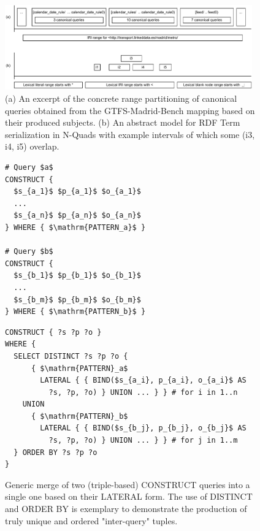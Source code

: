 \begin{figure}[htb]
\centering
\includegraphics[width=0.95\textwidth]{images/range-partitioning.pdf}
%

\caption{(a) An excerpt of the concrete range partitioning of canonical queries obtained from the GTFS-Madrid-Bench mapping based on their produced subjects. (b) An abstract model for RDF Term serialization in N-Quads with example intervals of which some (i3, i4, i5) overlap.}
\label{fig:range-partitioning}
\end{figure}


\begin{figure}[!h]
 \begin{minipage}[t]{0.29\textwidth}
  \centering
  \begin{lstlisting}[language=SPARQL, mathescape=true]
# Query $a$
CONSTRUCT {
  $s_{a_1}$ $p_{a_1}$ $o_{a_1}$
  ...
  $s_{a_n}$ $p_{a_n}$ $o_{a_n}$
} WHERE { $\mathrm{PATTERN_a}$ }

# Query $b$
CONSTRUCT {
  $s_{b_1}$ $p_{b_1}$ $o_{b_1}$
  ...
  $s_{b_m}$ $p_{b_m}$ $o_{b_m}$
} WHERE { $\mathrm{PATTERN_b}$ }
  \end{lstlisting}
 \end{minipage}
 \begin{minipage}[t]{0.69\textwidth}
  \centering
  \begin{lstlisting}[language=SPARQL, mathescape=true]
CONSTRUCT { ?s ?p ?o }
WHERE {
  SELECT DISTINCT ?s ?p ?o {
      { $\mathrm{PATTERN}_a$
        LATERAL { { BIND($s_{a_i}, p_{a_i}, o_{a_i}$ AS
          ?s, ?p, ?o) } UNION ... } } # for i in 1..n
    UNION
      { $\mathrm{PATTERN}_b$
        LATERAL { { BIND($s_{b_j}, p_{b_j}, o_{b_j}$ AS
          ?s, ?p, ?o) } UNION ... } } # for j in 1..m
  } ORDER BY ?s ?p ?o
}
  \end{lstlisting}
 \end{minipage}
 \vspace*{-5mm}
 \caption{Generic merge of two (triple-based) CONSTRUCT queries into a single one based on their LATERAL form. The use of DISTINCT and ORDER BY is exemplary to demonstrate the production of truly unique and ordered "inter-query" tuples.}
\label{fig:combine-lateral}
\end{figure}

